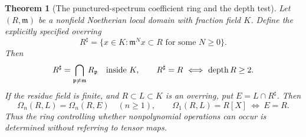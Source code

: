 \documentclass[11pt,a4paper]{article}
\newtheorem{theorem}{Theorem}[section]
\theoremstyle{definition}
\begin{document}
\begin{theorem}[The punctured-spectrum coefficient ring and the depth test]\label{result-27}
Let $(R,\mathfrak m)$ be a nonfield Noetherian local domain with
fraction field $K$. Define the explicitly specified overring
\[
 R^\sharp=\{x\in K:\mathfrak m^Nx\subset R
                    \text{ for some }N\ge0\}.
\]
Then
\[
 R^\sharp=\bigcap_{\mathfrak p\ne\mathfrak m}R_{\mathfrak p}
 \quad\hbox{inside }K,
 \qquad
 R^\sharp=R\ \Longleftrightarrow\ \operatorname{depth}R\ge2.
\]
If the residue field is finite, and $R\subset L\subset K$ is an
overring, put $E=L\cap R^\sharp$. Then
\[
 \Omega_n(R,L)=\Omega_n(R,E)\quad(n\ge1),
 \qquad
 \Omega_1(R,L)=R[X]\ \Longleftrightarrow\ E=R.
\]
Thus the ring controlling whether nonpolynomial operations can
occur is determined without referring to tensor maps.
\end{theorem}
\end{document}
